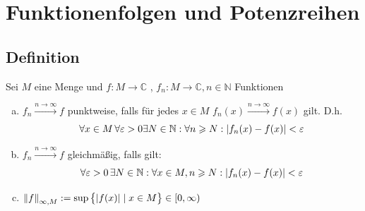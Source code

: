 
\newcommand{\fach}{Analysis \RM{2}.}
\newcommand{\semester}{SoSe 2013}
\newcommand{\homepage}{http://wwwmath.uni-muenster.de/u/wilhelm.winter/wwinter/analysis_II.html}
\newcommand{\prof}{Prof.\ Dr.\ Wilhelm Winter}




\maketitle
\begin{abstract}

\end{abstract}

\tableofcontents
\cleardoubleoddemptypage
{}
\setcounter{page}{1}
\setcounter{footnote}{0}


\section{Funktionenfolgen und Potenzreihen} %
\label{sec:funktionenfolgen_und_potenzreihen}

\subsection[Definition Konvergenz von Funktionenfolgen]{Definition} %
\label{sub:11}
Sei $M$ eine Menge und $f : M \to \mathds{C}$ , $f_n : M \to \mathds{C}, n \in \mathds{N} $ Funktionen 
\begin{enumerate}[a)]
	\item $f_n \xrightarrow{n \to \infty} f$ punktweise, falls für jedes $x \in M$ $f_n(x) \xrightarrow{n \to \infty} f(x)$ gilt. D.h.
	\[
		\forall x \in M \, \forall \varepsilon > 0 \exists N \in \mathds{N} : \forall n \ge N : \abs*{f_n(x) - f(x)} < \varepsilon
	\]
	\item $f_n \xrightarrow{n \to \infty} f$ gleichmäßig, falls gilt: 
	\[
		\forall \varepsilon >0 \, \exists N \in \mathds{N} : \forall x \in M , n \ge N : \abs*{f_n(x) - f(x)} < \varepsilon
	\]
	\item $\norm[\infty, M]{f} := \sup \big\{ \abs*{f(x)} \mid x \in M \big\} \in [0, \infty)$
\end{enumerate}


